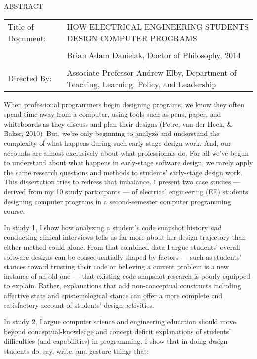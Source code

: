 ABSTRACT

\begin{longtable}[]{@{}ll@{}}
\toprule
Title of Document: & HOW ELECTRICAL ENGINEERING STUDENTS DESIGN COMPUTER
PROGRAMS\tabularnewline
&\tabularnewline
& Brian Adam Danielak, Doctor of Philosophy, 2014\tabularnewline
&\tabularnewline
Directed By: & Associate Professor Andrew Elby, Department of Teaching,
Learning, Policy, and Leadership\tabularnewline
\bottomrule
\end{longtable}

When professional programmers begin designing programs, we know they
often spend time away from a computer, using tools such as pens, paper,
and whiteboards as they discuss and plan their designs (Petre, van der
Hoek, \& Baker, 2010). But, we're only beginning to analyze and
understand the complexity of what happens during such early-stage design
work. And, our accounts are almost exclusively about what professionals
do. For all we've begun to understand about what happens in early-stage
software design, we rarely apply the same research questions and methods
to students' early-stage design work. This dissertation tries to redress
that imbalance. I present two case studies --- derived from my 10 study
participants --- of electrical engineering (EE) students designing
computer programs in a second-semester computer programming course.

In study 1, I show how analyzing a student's code snapshot history
\emph{and} conducting clinical interviews tells us far more about her
design trajectory than either method could alone. From that combined
data I argue students' overall software designs can be consequentially
shaped by factors --- such as students' stances toward trusting their
code or believing a current problem is a new instance of an old one ---
that existing code snapshot research is poorly equipped to explain.
Rather, explanations that add non-conceptual constructs including
affective state and epistemological stance can offer a more complete and
satisfactory account of students' design activities.

In study 2, I argue computer science and engineering education should
move beyond conceptual-knowledge and concept deficit explanations of
students' difficulties (and capabilities) in programming. I show that in
doing design students do, say, write, and gesture things that:

